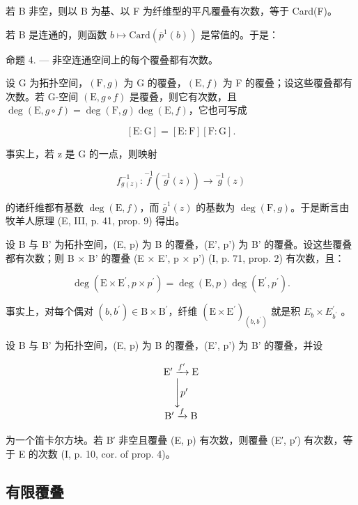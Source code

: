 若 B 非空，则以 B 为基、以 F 为纤维型的平凡覆叠有次数，等于 Card(F)。

若 B 是连通的，则函数 \(b \mapsto \text{Card}(\overline{p}^{1}(b))\) 是常值的。于是：

命题 4. --- 非空连通空间上的每个覆叠都有次数。

设 G 为拓扑空间，\((\mathrm{F}, g)\) 为 G 的覆叠，\((\mathrm{E}, f)\) 为 F 的覆叠；设这些覆叠都有次数。若 G-空间 \((\mathrm{E}, g \circ f)\) 是覆叠，则它有次数，且 \(\deg(\mathrm{E}, g \circ f) = \deg(\mathrm{F}, g) \deg(\mathrm{E}, f)\)，它也可写成

\[
[ \mathrm{E}: \mathrm{G} ] = [ \mathrm{E}: \mathrm{F} ] [ \mathrm{F}: \mathrm{G} ].
\]

事实上，若 z 是 G 的一点，则映射

\[
f _ {g (z)} ^ {- 1}: \stackrel {{- 1}} {{f}} (\stackrel {{- 1}} {{g}} (z)) \to \stackrel {{- 1}} {{g}} (z)
\]

的诸纤维都有基数 \(\deg(\mathrm{E}, f)\)，而 \(\overline{g}^1(z)\) 的基数为 \(\deg(\mathrm{F}, g)\)。于是断言由牧羊人原理 (E, III, p. 41, prop. 9) 得出。

设 B 与 B' 为拓扑空间，(E, p) 为 B 的覆叠，(E', p') 为 B' 的覆叠。设这些覆叠都有次数；则 B × B' 的覆叠 (E × E', p × p') (I, p. 71, prop. 2) 有次数，且：

\[
\deg (\mathrm{E} \times \mathrm{E} ^ {\prime}, p \times p ^ {\prime}) = \deg (\mathrm{E}, p) \deg (\mathrm{E} ^ {\prime}, p ^ {\prime}).
\]

事实上，对每个偶对 \((b,b^{\prime})\in\mathrm{B}\times\mathrm{B}^{\prime}\)，纤维 \((\mathrm{E}\times\mathrm{E}^{\prime})_{(b,b^{\prime})}\) 就是积 \(E_{b}\times E_{b^{\prime}}^{\prime}\) 。

设 B 与 B' 为拓扑空间，(E, p) 为 B 的覆叠，(E', p') 为 B' 的覆叠，并设

\[
\begin{array}{c} \mathrm{E} ^ {\prime} \xrightarrow {f ^ {\prime}} \mathrm{E} \\ \Biggl \downarrow p ^ {\prime} \\ \mathrm{B} ^ {\prime} \xrightarrow {f} \mathrm{B} \end{array}
\]

为一个笛卡尔方块。若 B′ 非空且覆叠 (E, p) 有次数，则覆叠 (E′, p′) 有次数，等于 E 的次数 (I, p. 10, cor. of prop. 4)。

\subsection{有限覆叠}

